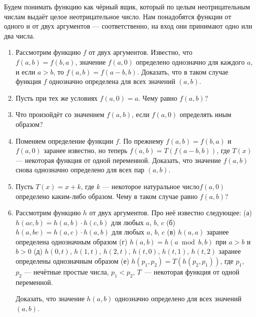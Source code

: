 
\ms Будем понимать функцию как чёрный ящик, который по целым неотрицательным числам выдаёт 
целое неотрицательное число. Нам понадобятся функции от одного и от двух аргументов --- 
соответственно, на вход они принимают одно или два числа.

\begin{enumerate}

\item Рассмотрим функцию $f$ от двух аргументов. Известно, что $f(a,b) = f(b,a)$, значение $f(a,0)$ определено однозначно для каждого $a$, и если $a>b$, то $f(a,b) = f(a-b,b)$. Доказать, что в таком случае функция $f$ однозначно определена для всех значений $(a,b)$.

\item Пусть при тех же условиях $f(a,0)=a$. Чему равно $f(a,b)$?

\item Что произойдёт со значением $f(a,b)$, если $f(a,0)$ определять иным образом?

\item Поменяем определение функции $f$. По прежнему $f(a,b) = f(b,a)$ и $f(a,0)$ заранее известно, но теперь $f(a,b) = T(f(a-b,b))$, где $T(x)$ --- некоторая функция от одной переменной. Доказать, что значение $f(a,b)$ снова однозначно определено для всех пар $(a,b)$.

\item Пусть $T(x) = x+k$, где $k$ --- некоторое натуральное число\scolon $f(a,0)$ определено каким-либо образом. Чему в таком случае равно $f(a,b)$?

\item Рассмотрим функцию $h$ от двух аргументов. Про неё известно следующее:
  \subitem (а) $h(ac,b) = h(a,b) \cdot h(c,b)$ для любых $a$, $b$, $c$\scolon
  \subitem (б) $h(a,bc) = h(a,c) \cdot h(a,b)$ для любых $a$, $b$, $c$\scolon
  \subitem (в) $h(a,a)$ заранее определена однозначным образом\scolon
  \subitem (г) $h(a,b) = h(a \bmod b, b)$ при $a>b$ и $b>0$\scolon
  \subitem (д) $h(0,t)$, $h(1,t)$, $h(2,t)$, $h(t,0)$, $h(t,1)$, $h(t,2)$ заранее определены однозначным образом\scolon
  \subitem (е) $h(p_1,p_2) = T(h(p_2,p_1))$, где $p_1$, $p_2$ --- нечётные простые числа, $p_1<p_2$, $T$~--- некоторая функция от одной переменной.

\ms Доказать, что значение $h(a,b)$ однозначно определено для всех значений $(a,b)$.

\end{enumerate}